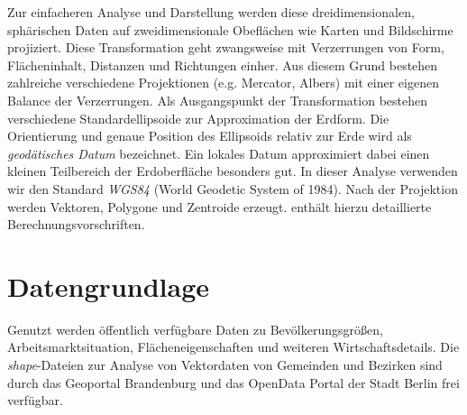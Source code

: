 Zur einfacheren Analyse und Darstellung werden diese dreidimensionalen, sphärischen Daten 
auf zweidimensionale Obeflächen wie Karten und Bildschirme projiziert. Diese Transformation 
geht zwangsweise mit Verzerrungen von Form, Flächeninhalt, Distanzen und Richtungen einher. 
Aus diesem Grund bestehen zahlreiche verschiedene Projektionen (e.g. Mercator, Albers) mit 
einer eigenen Balance der Verzerrungen. Als Ausgangspunkt der Transformation bestehen verschiedene
Standardellipsoide zur Approximation der Erdform. Die Orientierung und genaue Position 
des Ellipsoids relativ zur Erde wird als \emph{geodätisches Datum} bezeichnet. 
Ein lokales Datum approximiert dabei einen kleinen Teilbereich der Erdoberfläche besonders gut. 
In dieser Analyse verwenden wir den Standard \emph{WGS84} (World Geodetic System of 1984).
Nach der Projektion werden Vektoren, Polygone und Zentroide erzeugt. 
\cite[S. 49]{waller_applied_2004} enthält hierzu detaillierte Berechnungsvorschriften.

\section{Datengrundlage}

Genutzt werden öffentlich verfügbare Daten zu Bevölkerungsgrößen, Arbeitsmarktsituation, 
Flächeneigenschaften und weiteren Wirtschaftsdetails. 
Die \emph{shape}-Dateien zur Analyse von Vektordaten von Gemeinden und Bezirken 
sind durch das Geoportal Brandenburg und das OpenData Portal der Stadt Berlin frei verfügbar.

